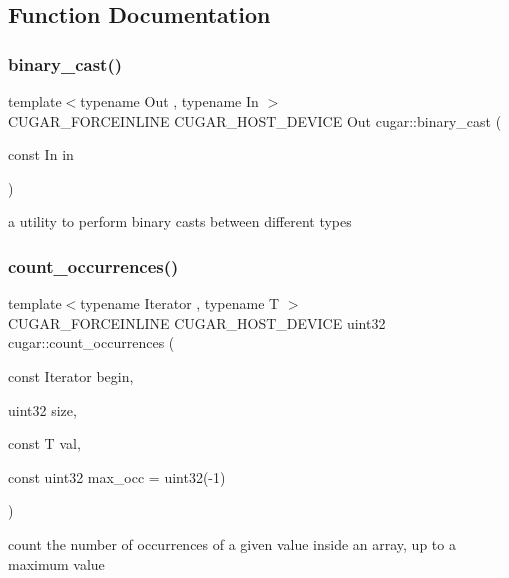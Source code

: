 \subsection{Function Documentation}
\mbox{\label{group___basic_utils_ga27a8f4df38255278583c8b582a7912bd}} 
\subsubsection{\texorpdfstring{binary\+\_\+cast()}{binary\_cast()}}
{\footnotesize\ttfamily template$<$typename Out , typename In $>$ \\
C\+U\+G\+A\+R\+\_\+\+F\+O\+R\+C\+E\+I\+N\+L\+I\+NE C\+U\+G\+A\+R\+\_\+\+H\+O\+S\+T\+\_\+\+D\+E\+V\+I\+CE Out cugar\+::binary\+\_\+cast (\begin{DoxyParamCaption}\item[{const In}]{in }\end{DoxyParamCaption})}

a utility to perform binary casts between different types \mbox{\label{group___basic_utils_gae983de927851c298a386b9a35b0e82e4}} 
\subsubsection{\texorpdfstring{count\+\_\+occurrences()}{count\_occurrences()}}
{\footnotesize\ttfamily template$<$typename Iterator , typename T $>$ \\
C\+U\+G\+A\+R\+\_\+\+F\+O\+R\+C\+E\+I\+N\+L\+I\+NE C\+U\+G\+A\+R\+\_\+\+H\+O\+S\+T\+\_\+\+D\+E\+V\+I\+CE uint32 cugar\+::count\+\_\+occurrences (\begin{DoxyParamCaption}\item[{const Iterator}]{begin,  }\item[{uint32}]{size,  }\item[{const T}]{val,  }\item[{const uint32}]{max\+\_\+occ = {\ttfamily uint32(-\/1)} }\end{DoxyParamCaption})}

count the number of occurrences of a given value inside an array, up to a maximum value \mbox{\label{group___basic_utils_gabb6714186dbbd864f0a9298944ba509b}} 
